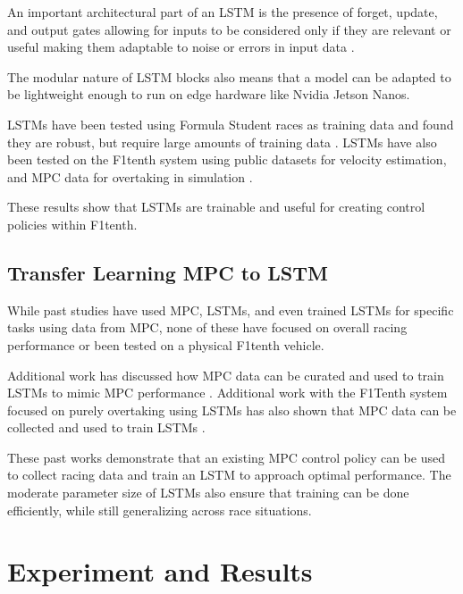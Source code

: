 \documentclass[conference]{IEEEtran}
\begin{document}
An important architectural part of an LSTM is the presence of forget, update, and output gates allowing for inputs to be considered only if they are relevant or useful making them adaptable to noise or errors in input data \cite{ai6090215}.


The modular nature of LSTM blocks also means that a model can be adapted to be lightweight enough to run on edge hardware like Nvidia Jetson Nanos. 

LSTMs have been tested using Formula Student races as training data and found they are robust, but require large amounts of training data \cite{srinivasan2020end}. LSTMs have also been tested on the F1tenth system using public datasets for velocity estimation, and MPC data for overtaking in simulation \cite{wegrzynowski2024learning,zhang2023f1tenth}. 

These results show that LSTMs are trainable and useful for creating control policies within F1tenth. 

\subsection{Transfer Learning MPC to LSTM}

While past studies have used MPC, LSTMs, and even trained LSTMs for specific tasks using data from MPC, none of these have focused on overall racing performance or been tested on a physical F1tenth vehicle. 

Additional work has discussed how MPC data can be curated and used to train LSTMs to mimic MPC performance \cite{munoz2023deep}. Additional work with the F1Tenth system focused on purely overtaking using LSTMs has also shown that MPC data can be collected and used to train LSTMs \cite{zhang2023f1tenth}.

These past works demonstrate that an existing MPC control policy can be used to collect racing data and train an LSTM to approach optimal performance. The moderate parameter size of LSTMs also ensure that training can be done efficiently, while still generalizing across race situations. 

\section{Experiment and Results}
\end{document}
